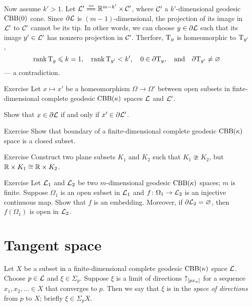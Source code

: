 Now assume $k'> 1$.
Let $\spc{L}'\iso \RR^{m-k'}\times \spc{C}'$, where $\mathcal{C}'$ a $k'$-dimensional geodesic $\mathrm{CBB}(0)$ cone.
Since $\partial\mathcal{L}$ is $(m-1)$-dimensional,
the projection of its image in $\mathcal{L}'$ to $\mathcal{C}'$
cannot be its tip.
In other words, we can choose $y\in \partial \mathcal{L}$ such that its image $y'\in \mathcal{L}'$ has nonzero projection in $\mathcal{C}'$.
Therfore, $\mathrm{T}_y$ is homeomorphic to $\mathrm{T}_{y'}$, 
\[\operatorname{\rm rank}\nolimits\mathrm{T}_y\leqslant k=1,
\quad
\operatorname{\rm rank}\nolimits\mathrm{T}_{y'}< k',
\quad
0\in \partial \mathrm{T}_y,
\quad\text{and}\quad
\partial \mathrm{T}_{y'}\ne \varnothing\]
--- a contradiction.
\qeds

\begin{thm}{Exercise}\label{ex:bry2bry}
Let $x\mapsto x'$ be a homeomorphism $\Omega\to\Omega'$
between open subsets in finte-dimensional complete geodesic $\mathrm{CBB}(\kappa)$ spaces $\mathcal{L}$ and $\mathcal{L}'$.

Show that $x\in \partial \mathcal{L}$ if and only if $x'\in \partial \mathcal{L}'$.

\end{thm}

\begin{thm}{Exercise}\label{ex:bry-closed}
Show that boundary of a finite-dimensional complete geodesic $\mathrm{CBB}(\kappa)$ space is a closed subset.
\end{thm}

\begin{thm}{Exercise}
Construct two plane subsets $K_1$ and $K_2$ such that $K_1\ncong K_2$,
but $\mathbb{R}\times K_1\cong \mathbb{R}\times K_2$.
\end{thm}

\begin{thm}{Exercise}
Let $\mathcal{L}_1$ and $\mathcal{L}_2$ be two $m$-dimensional geodesic $\mathrm{CBB}(\kappa)$ spaces; $m$ is finite.
Suppose $\Omega_1$ is an open subset in $\mathcal{L}_1$ and $f\colon\Omega_1\to \mathcal{L}_2$ is an injective continuous map.
Show that $f$ is an embedding.
Moreover, if $\partial\mathcal{L}_2=\varnothing$, then $f(\Omega_1)$ is open in $\mathcal{L}_2$.  
\end{thm}

\section{Tangent space}

Let $X$ be a subset in a finite-dimensional complete geodesic $\mathrm{CBB}(\kappa)$ space $\mathcal{L}$.
Choose $p\in \mathcal{L}$ and $\xi\in \Sigma_p$.
Suppose $\xi$ is a limit of directions ${\uparrow}_{[{p}{x_n}]}$ for a sequence $x_1,x_2,\dots{}\in X$ that converges to $p$.
Then we say that $\xi$ is in the \emph{space of directions} from $p$ to $X$; briefly $\xi\in\Sigma_pX$.

